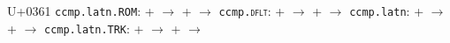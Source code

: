 \documentclass{article}
\begin{document}
\begin{substitutions}
\goodbreak

U+0361  \linebreak
    \texttt{ccmp.latn.ROM}:
\linebreak\null\quad{} \space +  \space $\to$  
\linebreak\null\quad{} \space +  \space $\to$  
\linebreak
\texttt{ccmp.\textsc{dflt}}:
\linebreak\null\quad{} \space +  \space $\to$  
\linebreak\null\quad{} \space +  \space $\to$  
\linebreak
\texttt{ccmp.latn}:
\linebreak\null\quad{} \space +  \space $\to$  
\linebreak\null\quad{} \space +  \space $\to$  
\linebreak
\texttt{ccmp.latn.TRK}:
\linebreak\null\quad{} \space +  \space $\to$  
\linebreak\null\quad{} \space +  \space $\to$  


\goodbreak

\end{substitutions}

\clearpage
\end{document}
